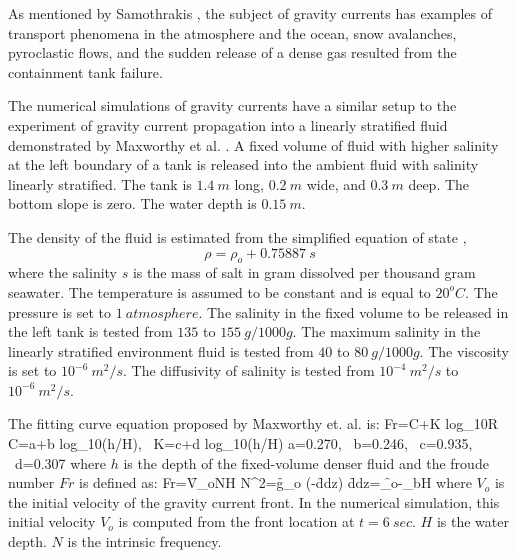 
As mentioned by Samothrakis \cite{Samothrakis2005}, the subject of gravity currents has examples of transport phenomena in the atmosphere and the ocean, snow avalanches, pyroclastic flows, and the sudden release of a dense gas resulted from the containment tank failure.

The numerical simulations of gravity currents have a similar setup to the experiment of gravity current propagation into a linearly stratified fluid demonstrated by Maxworthy et al. \cite{Maxworthy02}. A fixed volume of fluid with higher salinity at the left boundary of a tank is released into the ambient fluid with salinity linearly stratified. The tank is $1.4 \ m$ long, $0.2 \ m$ wide, and $0.3 \ m$ deep. The bottom slope is zero. The water depth is $0.15 \ m$.

The density of the fluid is estimated from the simplified equation of state \cite{Gill1982},
\begin{equation}
\rho = \rho_o +0.75887 \ s
\end{equation}
where the salinity $s$ is the mass of salt in gram dissolved per thousand gram seawater. The temperature is assumed to be constant and is equal to $20^o C$. The pressure is set to $1 \ atmosphere$. The salinity in the fixed volume to be released in the left tank is tested from $135$ to $155 \ g/1000g$. The maximum salinity in the linearly stratified environment fluid is tested from $40$ to $80 \ g/1000g$. The viscosity is set to $10^{-6} \ m^2/s$. The diffusivity of salinity is tested from $10^{-4} \ m^2/s$ to $10^{-6} \ m^2/s$.


The fitting curve equation proposed by Maxworthy et. al. \cite{Maxworthy02} is:
\be
Fr=C+K \cdot log_{10}R
\label{eqn:gravitycurrent-fitting}
\ee
\be
C=a+b \cdot log_{10}(h/H), \ K=c+d \cdot log_{10}(h/H)
\ee
\be
a=0.270, \ b=0.246, \ c=0.935, \ d=0.307
\ee
where $h$ is the depth of the fixed-volume denser fluid and the froude number $Fr$ is defined as:
\be
Fr=\f{V_o}{NH}
\ee
\be
N^2=\f{g}{\rho_o} (-\f{d\rho}{dz})
\ee
\be
\f{d\rho}{dz}=\f{\rho_o-\rho_b}{H}
\ee
where $V_o$ is the initial velocity of the gravity current front. In the numerical simulation, this initial velocity $V_o$ is computed from the front location at $t=6 \ sec$. $H$ is the water depth. $N$ is the intrinsic frequency.

